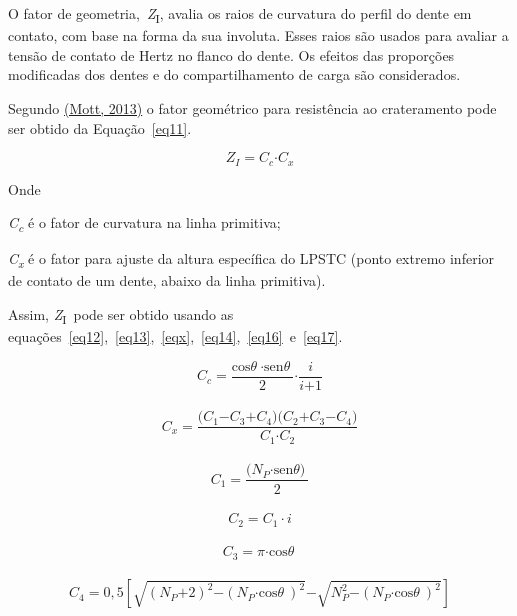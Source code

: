 \documentclass[12pt,a4paper]{article}
\begin{document}
{\label{749784}}

O fator de geometria,~\emph{Z}\textsubscript{I}, avalia os raios de
curvatura do perfil do dente em contato, com base na forma da sua
involuta. Esses raios são usados para avaliar a tensão de contato de
Hertz no flanco do dente. Os efeitos das proporções modificadas dos
dentes e do compartilhamento de carga são considerados.

Segundo \hyperref[csl:21]{(Mott, 2013)} o fator geométrico para resistência ao
crateramento pode ser obtido da Equação~{\ref{eq11}}.

\begin{equation}
\label{eq11}
Z_I\mathrm{=}C_c\mathrm{\cdot }C_x
\end{equation}

Onde

\emph{C\textsubscript{c}} é o fator de curvatura na linha primitiva;

\emph{C\textsubscript{x}} é o fator para ajuste da altura específica do
LPSTC (ponto extremo inferior de contato de um dente, abaixo da linha
primitiva).

Assim, \emph{Z}\textsubscript{I}~pode ser obtido usando as
equações~{\ref{eq12}},~{\ref{eq13}},~{\ref{eqx}},~{\ref{eq14}},~{\ref{eq16}}~e~{\ref{eq17}}.

\begin{equation}
\label{eq12}
C_c\mathrm{=}\frac{{\mathrm{cos} \theta \ }\mathrm{\cdot }{\mathrm{sen} \theta \ }}{\mathrm{2}}\mathrm{\cdot }\frac{i}{i\mathrm{+1}}
\end{equation}
\\
\begin{equation}
\label{eq13}
C_x\mathrm{=}\frac{\mathrm{(}C_{\mathrm{1}}\mathrm{-}C_{\mathrm{3}}\mathrm{+}C_{\mathrm{4}}\mathrm{)(}C_{\mathrm{2}}\mathrm{+}C_{\mathrm{3}}\mathrm{-}C_{\mathrm{4}}\mathrm{)}}{C_{\mathrm{1}}\mathrm{\cdot }C_{\mathrm{2}}}
\end{equation}
\\
\begin{equation}
\label{eqx}
C_1=\frac{\mathrm{(}N_P\mathrm{\cdot }{\mathrm{sen} \theta \mathrm{)}\ }}{\mathrm{2}}
\end{equation}
\\
\begin{equation}
\label{eq14}
C_{\mathrm{2}}\mathrm{=}C_1{\cdot }i
\end{equation}
\\
\begin{equation}
\label{eq16}
C_{\mathrm{3}}\mathrm{=}\pi \mathrm{\cdot }{\mathrm{cos} \theta \ }
\end{equation}
\\
\begin{equation}
\label{eq17}
C_{\mathrm{4}}\mathrm{=0,5}\left[\sqrt{{\left(N_P\mathrm{+2}\right)}^{\mathrm{2}}\mathrm{-}{\left(N_P\mathrm{\cdot }{\mathrm{cos} \theta \ }\right)}^{\mathrm{2}}}\mathrm{-}\sqrt{N^{\mathrm{2}}_P\mathrm{-}{\left(N_P\mathrm{\cdot }{\mathrm{cos} \theta \ }\right)}^{\mathrm{2}}}\right]
\end{equation}
\end{document}
